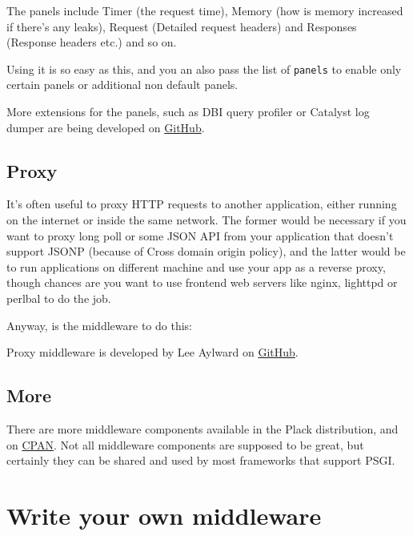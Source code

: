 The panels include Timer (the request time), Memory (how is memory
increased if there's any leaks), Request (Detailed request headers) and
Responses (Response headers etc.) and so on.


Using it is so easy as this, and you an also pass the list of
\lstinline!panels! to enable only certain panels or additional non
default panels.

More extensions for the panels, such as DBI query profiler or Catalyst
log dumper are being developed on
\href{http://github.com/miyagawa/plack-middleware-debug/}{GitHub}.

\section{Proxy}\label{proxy}

It's often useful to proxy HTTP requests to another application, either
running on the internet or inside the same network. The former would be
necessary if you want to proxy long poll or some JSON API from your
application that doesn't support JSONP (because of Cross domain origin
policy), and the latter would be to run applications on different
machine and use your app as a reverse proxy, though chances are you want
to use frontend web servers like nginx, lighttpd or perlbal to do the
job.

Anyway,  is the middleware to do this:


Proxy middleware is developed by Lee Aylward on
\href{http://github.com/leedo/Plack-App-Proxy}{GitHub}.

\section{More}\label{more}

There are more middleware components available in the Plack
distribution, and on
\href{http://search.cpan.org/search?query=plack+middleware\&mode=dist}{CPAN}.
Not all middleware components are supposed to be great, but certainly
they can be shared and used by most frameworks that support PSGI.

\chapter{Write your own
middleware}\label{day-23-write-your-own-middleware}

